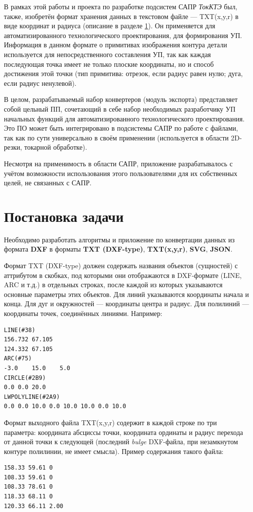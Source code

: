В рамках этой работы и проекта по разработке подсистем САПР \textit{ТокКТЭ} был, также, изобретён формат хранения данных в текстовом файле --- TXT(x,y,r) в виде координат и радиуса (описание в разделе \ref{sec:aufgabe}). Он применяется для автоматизированного технологического проектирования, для формирования УП. Информация в данном формате о примитивах изображения контура детали используется для непосредственного составления УП, так как каждая последующая точка имеет не только плоские координаты, но и способ достижения этой точки (тип примитива: отрезок, если радиус равен нулю; дуга, если радиус ненулевой).

В целом, разрабатываемый набор конвертеров (модуль экспорта) представляет собой цельный ПП, сочетающий в себе набор необходимых разработчику УП начальных функций для автоматизированного технологического проектирования. Это ПО может быть интегрировано в подсистемы САПР по работе с файлами, так как по сути универсально в своём применении (используется в области 2D-резки, токарной обработке).

Несмотря на применимость в области САПР, приложение разрабатывалось с учётом возможности использования этого пользователями для их собственных целей, не связанных с САПР.


\section{Постановка задачи} \label{sec:aufgabe}

Необходимо разработать алгоритмы и приложение по конвертации данных из формата \textbf{DXF} в форматы \textbf{TXT (DXF-type)}, \textbf{TXT(x,y,r)}, \textbf{SVG}, \textbf{JSON}.

Формат TXT (DXF-type) должен содержать названия объектов (сущностей) с аттрибутом в скобках, под которыми они отображаются в DXF-формате (LINE, ARC и т.д.) в отдельных строках, после каждой из которых указываются основные параметры этих объектов. Для линий указываются координаты начала и конца. Для дуг и окружностей --- координаты центра и радиус. Для полилиний --- координаты точек, соединённых линиями. Например:
\begin{lstlisting}[label=list:dxftxtscheme]
LINE(#38)
156.732	67.105
124.332	67.105
ARC(#75)
-3.0	15.0	5.0
CIRCLE(#2B9)
0.0 0.0 20.0
LWPOLYLINE(#2A9)
0.0 0.0 10.0 0.0 10.0 10.0 0.0 10.0 
\end{lstlisting}

Формат выходного файла TXT(x,y,r) содержит в каждой строке по три параметра: координата абсциссы точки, координата ординаты и радиус перехода от данной точки к следующей (последний \textit{bulge} DXF-файла, при незамкнутом контуре полилинии, не имеет смысла). Пример содержания такого файла:
\begin{lstlisting}[label=list:dxftxtscheme]
158.33 59.61 0
108.33 59.61 0
108.33 78.61 0
118.33 68.11 0
120.33 66.11 2.00
\end{lstlisting}

